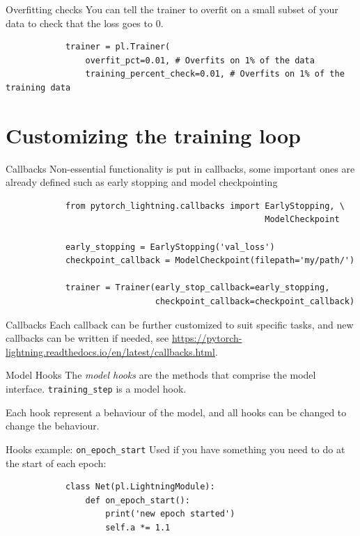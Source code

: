 \documentclass[aspectratio=169]{beamer}
\begin{document}
	\begin{frame}[fragile]{Overfitting checks}
		You can tell the trainer to overfit on a small subset of your data to check that the loss goes to 0.
		\begin{verbatim}
			trainer = pl.Trainer(
				overfit_pct=0.01, # Overfits on 1% of the data
				training_percent_check=0.01, # Overfits on 1% of the training data
		\end{verbatim}
	\end{frame}

	\section{Customizing the training loop}

	\begin{frame}[fragile]{Callbacks}
		Non-essential functionality is put in callbacks, some important ones are already defined such as early stopping and model checkpointing
		\begin{verbatim}
			from pytorch_lightning.callbacks import EarlyStopping, \
													ModelCheckpoint

			early_stopping = EarlyStopping('val_loss')
			checkpoint_callback = ModelCheckpoint(filepath='my/path/')

			trainer = Trainer(early_stop_callback=early_stopping,
							  checkpoint_callback=checkpoint_callback)
		\end{verbatim}
		
	\end{frame}

	\begin{frame}{Callbacks}
		Each callback can be further customized to suit specific tasks, and new callbacks can be written if needed, see \small\url{https://pytorch-lightning.readthedocs.io/en/latest/callbacks.html}.
	\end{frame}

	\begin{frame}[fragile]{Model Hooks}
		The \emph{model hooks} are the methods that comprise the model interface. \texttt{training\_step} is a model hook.

		Each hook represent a behaviour of the model, and all hooks can be changed to change the behaviour.
	\end{frame}

	\begin{frame}[fragile]{Hooks example: \texttt{on\_epoch\_start}}
		Used if you have something you need to do at the start of each epoch:

		\begin{verbatim}
			class Net(pl.LightningModule):
				def on_epoch_start():
					print('new epoch started')
					self.a *= 1.1
		\end{verbatim}
	\end{frame}
\end{document}

